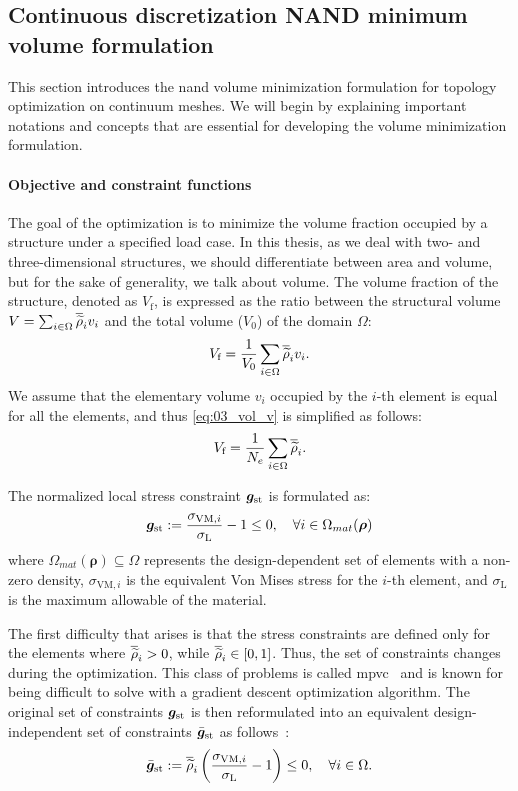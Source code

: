\subsection{Continuous discretization NAND minimum volume formulation}
This section introduces the \gls{nand} volume minimization formulation for topology optimization on continuum meshes. We will begin by explaining important notations and concepts that are essential for developing the volume minimization formulation.
\paragraph{Objective and constraint functions}
The goal of the optimization is to minimize the volume fraction occupied by a structure under a specified load case. In this thesis, as we deal with two- and three-dimensional structures, we should differentiate between area and volume, but for the sake of generality, we talk about volume. The volume fraction of the structure, denoted as $V_\text{f}$, is expressed as the ratio between the structural volume $V=\sum_{i \in \Omega} \overline{\widetilde{\rho}}_i v_i$ and the total volume ($V_0$) of the domain $\Omega$:
\begin{equation}
    V_\text{f} = \frac{1}{V_0}\sum_{i \in \Omega} \overline{\widetilde{\rho}}_i v_i.
    \label{eq:03_vol_v}
\end{equation}
We assume that the elementary volume $v_i$ occupied by the $i$-th element is equal for all the elements, and thus \eqref{eq:03_vol_v} is simplified as follows:
\begin{equation}
    V_\text{f} = \frac{1}{N_{e}} \sum_{i \in \Omega} \overline{\widetilde{\rho}}_i. 
    \label{eq:03_obj_vol}  
\end{equation}

The normalized local stress constraint $\bm{g}_{\text{st}}$ is formulated as:
\begin{equation}
    \bm{g}_{\text{st}}:=\frac{\sigma_{\text{VM},i}}{\sigma_\text{L}}-1 \leq 0, \quad \forall i \in \Omega_{mat}(\bm{\rho})
\end{equation}
where $\Omega_{mat}(\bm{\rho}) \subseteq \Omega$ represents the design-dependent set of elements with a non-zero density, $\sigma_{\text{VM},i}$ is the equivalent Von Mises stress for the $i$-th element, and $\sigma_\text{L}$ is the maximum allowable of the material.

The first difficulty that arises is that the stress constraints are defined only for the elements where $\overline{\widetilde{\rho}}_i > 0$, while $\overline{\widetilde{\rho}}_i\in[0,1]$. Thus, the set of constraints changes during the optimization. This class of problems is called \acrfull{mpvc}~ and is known for being difficult to solve with a gradient descent optimization algorithm. The original set of constraints $\bm{g}_{\text{st}}$ is then reformulated into an equivalent design-independent set of constraints $\bar{\bm{g}}_{\text{st}}$ as follows~:
\begin{equation}
    \bar{\bm{g}}_{\text{st}}:=\overline{\widetilde{\rho}}_i\left(\frac{ \sigma_{\text{VM},i}}{\sigma_\text{L}}-1 \right) \leq 0, \quad \forall i \in \Omega.
\end{equation}

